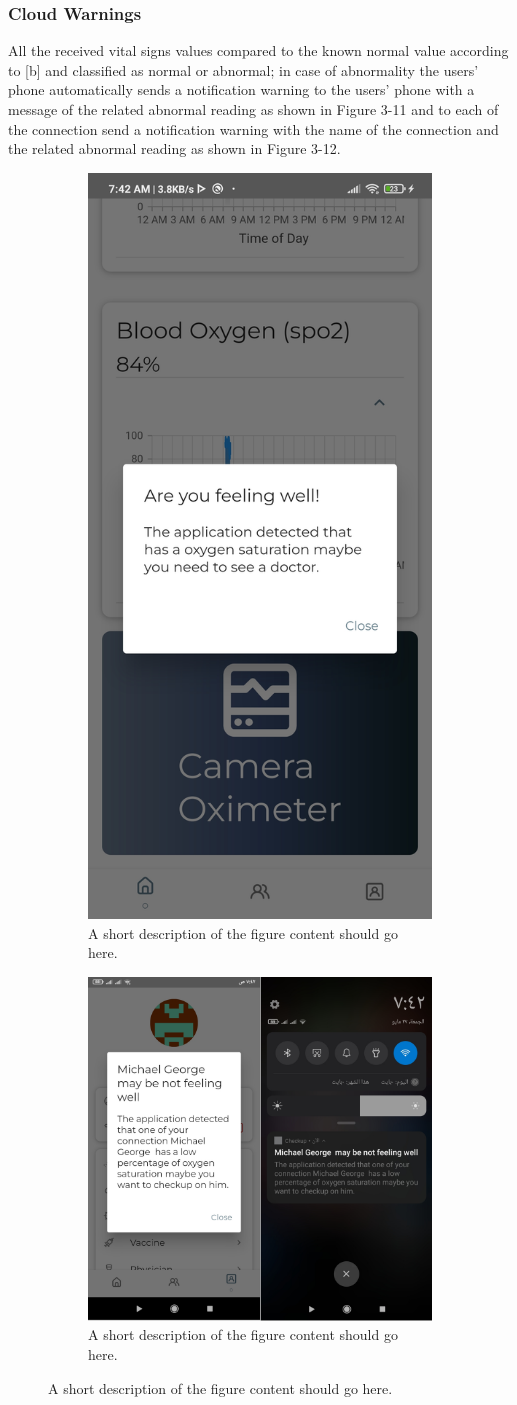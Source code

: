 \documentclass{bmcart}
\begin{document}
\subsubsection*{Cloud Warnings}
All the received vital signs values compared to the known normal value according
to [b] and classified as normal or abnormal; in case of abnormality the users’
phone automatically sends a notification warning to the users’ phone with a
message of the related abnormal reading as shown in Figure 3-11 and to each of
the connection send a notification warning with the name of the connection and
the related abnormal reading as shown in Figure 3-12.
\begin{figure}[h!]
  \begin{subfigure}{0.45\textwidth}
  \includegraphics[width=.3\linewidth]{jpg_images/user_warning.jpg}
  \caption{
      A short description of the figure content should go here.}
    \end{subfigure}
    \begin{subfigure}{0.45\textwidth}
    \includegraphics[width=.7\linewidth]{png_images/connection_warnning.png}
  \caption{
      A short description of the figure content should go here.}
    \end{subfigure}

    \end{figure}
\FloatBarrier
\end{document}
